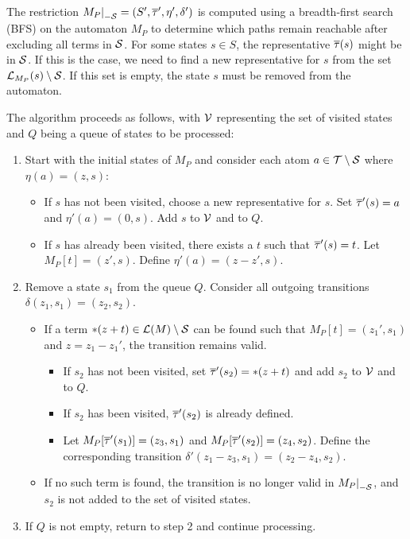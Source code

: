 The restriction $\restr{M_P}{-\Set} = (S', \otau', \eta', \delta')$ is computed using a breadth-first search (BFS) on the automaton $M_P$
to determine which paths remain reachable after excluding all terms in $\mathcal{S}$.
For some states $s \in S$, the representative $\overline{\tau}(s)$ might be in $\mathcal{S}$.
If this is the case, we need to find a new representative for $s$ from the set $\mathcal{L}_{M_P}(s) \setminus \mathcal{S}$.
If this set is empty, the state $s$ must be removed from the automaton.

The algorithm proceeds as follows, with $\mathcal{V}$ representing the set of visited states and $Q$ being a queue of states to be processed:
\begin{enumerate}
\item Start with the initial states of $M_P$ and consider each atom $a \in \mathcal{T} \setminus \mathcal{S}$ where $\eta(a) = (z, s)$:
   \begin{itemize}
       \item If $s$ has not been visited, choose a new representative for $s$.
       Set $\overline{\tau}'(s) = a$ and $\eta'(a) = (0, s)$.
       Add $s$ to $\mathcal{V}$ and to $Q$.
       \item If $s$ has already been visited, there exists a $t$ such that $\overline{\tau}'(s) = t$.
       Let $M_P[t] = (z', s)$.
       Define $\eta'(a) = (z - z', s)$.
   \end{itemize}

\item Remove a state $s_1$ from the queue $Q$.
Consider all outgoing transitions $\delta(z_1, s_1) = (z_2, s_2)$.
   \begin{itemize}
       \item If a term $*(z+t) \in \mathcal{L}(M) \setminus \mathcal{S}$ can be found such that $M_P[t] = (z_1', s_1)$ and $z = z_1 - z_1'$,
       the transition remains valid.
           \begin{itemize}
               \item If $s_2$ has not been visited, set $\overline{\tau}'(s_2) = *(z+t)$ and add $s_2$ to $\mathcal{V}$ and to $Q$.
               \item If $s_2$ has been visited, $\overline{\tau}'(s_2)$ is already defined.
               \item Let $M_P[\overline{\tau}'(s_1)] = (z_3, s_1)$ and $M_P[\overline{\tau}'(s_2)] = (z_4, s_2)$.
               Define the corresponding transition $\delta'(z_1 - z_3, s_1) = (z_2 - z_4, s_2)$.
           \end{itemize}
       \item If no such term is found, the transition is no longer valid in $\restr{M_P}{-\Set}$, and $s_2$ is not added to the set of visited states.
   \end{itemize}
\item If $Q$ is not empty, return to step 2 and continue processing.
\end{enumerate}

